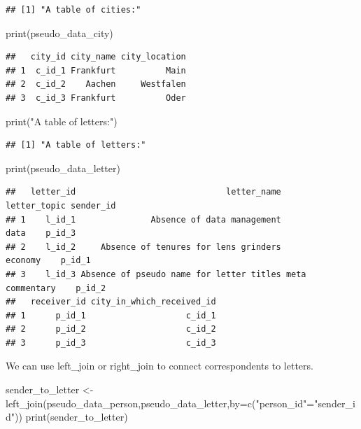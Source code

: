 \documentclass[
]{book}
\newenvironment{Shaded}{\begin{snugshade}}{\end{snugshade}}
\newcommand{\AttributeTok}[1]{\textcolor[rgb]{0.77,0.63,0.00}{#1}}
\newcommand{\FunctionTok}[1]{\textcolor[rgb]{0.00,0.00,0.00}{#1}}
\newcommand{\NormalTok}[1]{#1}
\newcommand{\OtherTok}[1]{\textcolor[rgb]{0.56,0.35,0.01}{#1}}
\newcommand{\StringTok}[1]{\textcolor[rgb]{0.31,0.60,0.02}{#1}}
\begin{document}
\begin{verbatim}
## [1] "A table of cities:"
\end{verbatim}

\begin{Shaded}
\begin{Highlighting}[]
\FunctionTok{print}\NormalTok{(pseudo\_data\_city)}
\end{Highlighting}
\end{Shaded}

\begin{verbatim}
##   city_id city_name city_location
## 1  c_id_1 Frankfurt          Main
## 2  c_id_2    Aachen     Westfalen
## 3  c_id_3 Frankfurt          Oder
\end{verbatim}

\begin{Shaded}
\begin{Highlighting}[]
\FunctionTok{print}\NormalTok{(}\StringTok{"A table of letters:"}\NormalTok{)}
\end{Highlighting}
\end{Shaded}

\begin{verbatim}
## [1] "A table of letters:"
\end{verbatim}

\begin{Shaded}
\begin{Highlighting}[]
\FunctionTok{print}\NormalTok{(pseudo\_data\_letter)}
\end{Highlighting}
\end{Shaded}

\begin{verbatim}
##   letter_id                              letter_name    letter_topic sender_id
## 1    l_id_1               Absence of data management            data    p_id_3
## 2    l_id_2     Absence of tenures for lens grinders         economy    p_id_1
## 3    l_id_3 Absence of pseudo name for letter titles meta commentary    p_id_2
##   receiver_id city_in_which_received_id
## 1      p_id_1                    c_id_1
## 2      p_id_2                    c_id_2
## 3      p_id_3                    c_id_3
\end{verbatim}

We can use left\_join or right\_join to connect correspondents to letters.

\begin{Shaded}
\begin{Highlighting}[]
\NormalTok{sender\_to\_letter }\OtherTok{\textless{}{-}} \FunctionTok{left\_join}\NormalTok{(pseudo\_data\_person,pseudo\_data\_letter,}\AttributeTok{by=}\FunctionTok{c}\NormalTok{(}\StringTok{"person\_id"}\OtherTok{=}\StringTok{"sender\_id"}\NormalTok{))}
\FunctionTok{print}\NormalTok{(sender\_to\_letter)}
\end{Highlighting}
\end{Shaded}
\end{document}
